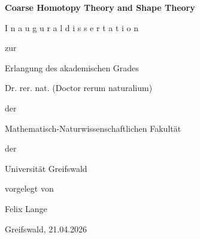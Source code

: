 \documentclass[a4paper,11pt]{article}
\theoremstyle{definition}
\theoremstyle{plain}
\theoremstyle{remark}
\begin{document}
\begin{center}

\vspace*{2.5cm}

\huge

\textbf{Coarse Homotopy Theory and Shape Theory}

\vspace{2cm}

\normalsize

I n a u g u r a l d i s s e r t a t i o n 

\vspace{.5cm}

zur 

\vspace{.5cm}

Erlangung des akademischen Grades

\vspace{.5cm}

Dr. rer. nat. (Doctor rerum naturalium) 

\vspace{.5cm}

der

\vspace{.5cm}

Mathematisch-Naturwissenschaftlichen Fakultät

\vspace{.5cm}

der

\vspace{.5cm}

Universität Greifswald

\end{center}

\vspace{1.5cm}

\begin{flushright}

vorgelegt von \qquad \qquad \qquad \qquad \qquad \qquad 

\vspace{.4cm}

Felix Lange \, \,\,\qquad \qquad \qquad \qquad \qquad \qquad 

\end{flushright}

\vspace{1.5cm}

\begin{center}
Greifswald, 21.04.2026
\end{center}
\end{document}
